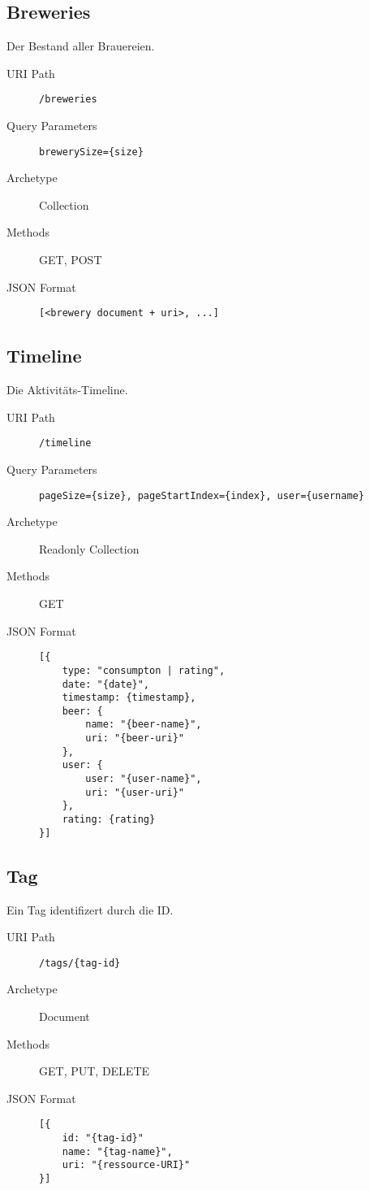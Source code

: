\documentclass[10pt,a4paper]{scrartcl}
\begin{document}
\subsection{Breweries}

Der Bestand aller Brauereien.

\begin{description}
	\item[URI Path] \texttt{/breweries}
	\item[Query Parameters] \texttt{brewerySize=\{size\}}
	\item[Archetype] Collection
	\item[Methods] GET, POST
	\item[JSON Format] \hfill
\begin{lstlisting}
[<brewery document + uri>, ...]
\end{lstlisting}
\end{description}


\subsection{Timeline}

Die Aktivitäts-Timeline.

\begin{description}
 	\item[URI Path] \texttt{/timeline}
	\item[Query Parameters] \texttt{pageSize=\{size\}, pageStartIndex=\{index\}, user=\{username\}}
	\item[Archetype] Readonly Collection
	\item[Methods] GET
	\item[JSON Format] \hfill
\begin{lstlisting}
[{	
	type: "consumpton | rating",
	date: "{date}",
	timestamp: {timestamp},
	beer: {
		name: "{beer-name}",
		uri: "{beer-uri}"
	},
	user: {
		user: "{user-name}",
		uri: "{user-uri}"	
	},
	rating: {rating}
}]
\end{lstlisting}
\end{description}


\subsection{Tag}

Ein Tag identifizert durch die ID.

\begin{description}
	\item[URI Path] \texttt{/tags/\{tag-id\}}
	\item[Archetype] Document
	\item[Methods] GET, PUT, DELETE
	\item[JSON Format] \hfill
\begin{lstlisting}
[{	
	id: "{tag-id}"
	name: "{tag-name}",
	uri: "{ressource-URI}"
}]
\end{lstlisting}
\end{description}
\end{document}
